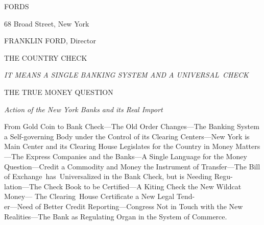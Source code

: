 \documentclass[twoside,symmetric,nobib,justified]{tufte-book}
\begin{document}
\begin{LARGE}


\end{LARGE}

\vspace{0.5in}
\begin{center}
    

{\huge FORDS}

\vspace{0.2in}

{\LARGE 68 Broad Street, New York}

\vspace{0.2in}

{\large FRANKLIN FORD, Director}

\vspace{.35in}

{\LARGE THE COUNTRY CHECK}

\vspace{0.2in}

{\Large \emph{IT MEANS A SINGLE BANKING SYSTEM
AND A
UNIVERSAL~CHECK}}

\vspace{0.2in}

{\Large THE TRUE MONEY QUESTION}

\vspace{0.2in}

{\large \emph{Action of the New York Banks and its Real
Import}}

\end{center}

\vspace{0.2in}

\begin{bfseries}
    
\begin{hangparas}{0.25in}{1}
    

From Gold Coin to Bank Check---The Old Order Changes---The Banking
System a Self-governing Body under the Control of its Clearing
Centers---New York is Main Center and its Clearing House Legislates for
the Country in Money Matters---The Express Companies and the Banks---A
Single Language for the Money Question---Credit a Commodity and Money
the Instrument of Transfer---The Bill of Exchange~has~Universalized in
the Bank Check, but is Needing Regu-\\\noindent lation---The Check Book to be
Certified---A Kiting Check the New Wildcat Money--- The Clearing~House
Certificate a New Legal Tend-\\\noindent er---Need of Better Credit
Reporting---Congress Not in Touch with the New Realities---The Bank as
Regulating Organ in the System of Commerce.

\end{hangparas}

\end{bfseries}
\end{document}
